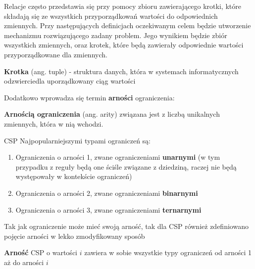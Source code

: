     Relacje często przedstawia się przy pomocy zbioru zawierającego krotki, które składają się ze wszystkich 
    przyporządkowań wartości do odpowiednich zmiennych.
    Przy następujących definicjach oczekiwanym celem będzie utworzenie mechanizmu rozwiązującego zadany problem. Jego wynikiem 
    będzie zbiór wszystkich zmiennych, oraz krotek, które będą zawierały odpowiednie wartości przyporządkowane dla zmiennych.
    \begin{definition}
        \label{Krotka}
        \textbf{Krotka} (ang. tuple) - struktura danych, która w systemach informatycznych odzwierciedla uporządkowany ciąg wartości
    \end{definition}
    Dodatkowo wprowadza się termin \textbf{arności} ograniczenia:
    \begin{definition}
        \label{Krotka}
        \textbf{Arnością ograniczenia} (ang. arity)  związana jest z liczbą unikalnych zmiennych, która w nią wchodzi.
    \end{definition}
    CSP 
    Najpopularniejszymi typami ograniczeń są:
    \begin{enumerate}
        \item Ograniczenia o arności 1, zwane ograniczeniami \textbf{unarnymi} (w tym przypadku z reguły będą one ściśle związane z dziedziną, raczej 
        nie będą występowały w kontekście ograniczeń)
        \item Ograniczenia o arności 2, zwane ograniczeniami \textbf{binarnymi}
        \item Ograniczenia o arności 3, zwane ograniczeniami \textbf{ternarnymi}
    \end{enumerate} 

    Tak jak ograniczenie może mieć swoją arność, tak dla CSP również zdefiniowano pojęcie arności w lekko zmodyfikowany sposób 
    \begin{definition}
        \textbf{Arność} CSP o wartości $i$ zawiera w sobie wszystkie typy ograniczeń od arności 1 aż do arności $i$
    \end{definition}

